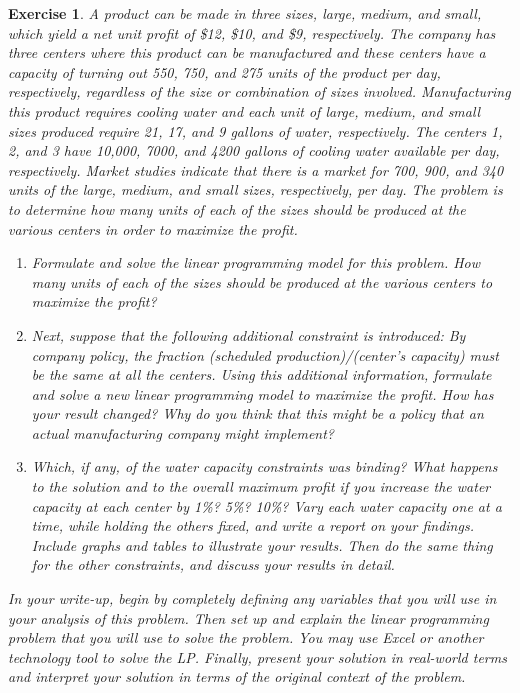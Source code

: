 \documentclass[letterpaper,10pt]{article}
\newtheorem{ex}{Exercise}
\begin{document}
\begin{ex}
A product can be made in three sizes, large, medium, and small, which yield a net unit profit of \$12, \$10, and \$9, respectively. The company has three centers where this product can be manufactured and these centers have a capacity of turning out 550, 750, and 275 units of the product per day, respectively, regardless of the size or combination of sizes involved.
Manufacturing this product requires cooling water and each unit of large, medium, and small sizes produced require 21, 17, and 9 gallons of water, respectively. The centers 1, 2, and 3 have 10,000, 7000, and 4200 gallons of cooling water available per day, respectively. Market studies indicate that there is a market for 700, 900, and 340 units of the large, medium, and small sizes, respectively, per day. The problem is to determine how many units of each of the sizes should be produced at the various centers in order to maximize the profit.  

\begin{enumerate}
\item[(a)] Formulate and solve the linear programming model for this problem.  How many units of each of the sizes should be produced at the various centers to maximize the profit?
\item[(b)] Next, suppose that the following additional constraint is introduced:
By company policy, the fraction (scheduled production)/(center's capacity) must be the same at all the centers.
Using this additional information, formulate and solve a new linear programming model to maximize the profit.  How has your result changed?  Why do you think that this might be a policy that an actual manufacturing company might implement?
\item[(c)] Which, if any, of the water capacity constraints was {\em binding}?  What happens to the solution and to the overall maximum profit if you increase the water capacity at each center by 1\%?  5\%?  10\%?  Vary each water capacity one at a time, while holding the others fixed, and write a report on your findings.  Include graphs and tables to illustrate your results.  Then do the same thing for the other constraints, and discuss your results in detail.  
\end{enumerate}
In your write-up, begin by completely defining any variables that you will use in your analysis of this problem.  Then set up and explain the linear programming problem that you will use to solve the problem.  You may use Excel or another technology tool to solve the LP.  Finally, present your solution in real-world terms and interpret your solution in terms of the original context of the problem. 
\end{ex}
\end{document}
